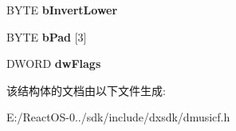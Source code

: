\begin{DoxyCompactItemize}
B\+Y\+TE {\bfseries b\+Invert\+Lower}
\item 
\mbox{\label{struct___d_m_u_s___i_o___s_t_y_l_e_p_a_r_t_ac3bf428845128660cd079c8bd2358a30}} 
B\+Y\+TE {\bfseries b\+Pad} \mbox{[}3\mbox{]}
\item 
\mbox{\label{struct___d_m_u_s___i_o___s_t_y_l_e_p_a_r_t_ac7e3caf2dd6c77c003c4206c09868573}} 
D\+W\+O\+RD {\bfseries dw\+Flags}
\end{DoxyCompactItemize}


该结构体的文档由以下文件生成\+:\begin{DoxyCompactItemize}
\item 
E\+:/\+React\+O\+S-\/0../sdk/include/dxsdk/dmusicf.\+h\end{DoxyCompactItemize}
